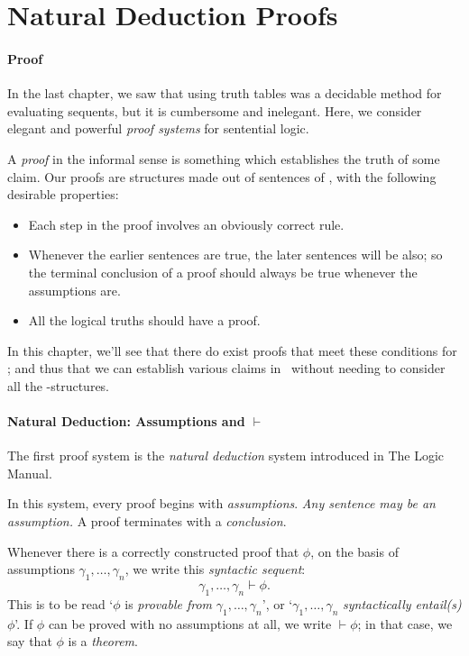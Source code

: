 

\section{Natural Deduction Proofs}
\paragraph{Proof}

In the last chapter, we saw that using truth tables was a decidable method for evaluating sequents, but it is cumbersome and inelegant. Here, we consider elegant and powerful \emph{proof systems} for sentential logic.

A \emph{proof} in the informal sense is something which establishes the truth of some claim. Our proofs are structures made out of sentences of \lone, with the following desirable properties: \begin{itemize}
	\item Each step in the proof involves an obviously correct rule.
	\item Whenever the earlier sentences are true, the later sentences will be also; so the terminal conclusion of a proof should always be true whenever the assumptions are.
	\item All the logical truths should have a proof.
\end{itemize}

In this chapter, we'll see that there do exist proofs that meet these conditions for \lone; and thus that we can establish various claims in \lone\ without needing to consider all the \lone-structures.

\paragraph{Natural Deduction: Assumptions and $\vdash$}

The first proof system is the \emph{natural deduction} system introduced in The Logic Manual. 

In this system, every proof begins with \emph{assumptions}. \emph{Any sentence may be an assumption.} A proof terminates with a \emph{conclusion}. 

 Whenever there is a correctly constructed proof that $\phi$, on the basis of assumptions $\gamma_{1},\ldots,\gamma_{n}$, we write this \emph{syntactic sequent}: {$$\gamma_{1},\ldots,\gamma_{n}\vdash\phi.$$} This is to be read `$\phi$ is \emph{provable from} $\gamma_{1},\ldots,\gamma_{n}$', or `$\gamma_{1},\ldots,\gamma_{n}$ \emph{syntactically entail(s)} $\phi$'. If $\phi$ can be proved with no assumptions at all, we write $\vdash\phi$; in that case, we say that $\phi$ is a \emph{theorem}.

